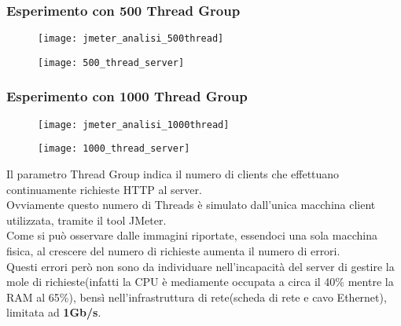 \subsubsection{Esperimento con 500 Thread Group}
\begin{minipage}{\linewidth}
  \centering
  \begin{minipage}{1\linewidth}
    \begin{figure}[H]
      \texttt{[image: jmeter\_analisi\_500thread]}
    \end{figure}
  \end{minipage}
  \begin{minipage}{1\linewidth}
    \begin{figure}[H]
      \texttt{[image: 500\_thread\_server]}
    \end{figure}
  \end{minipage}
\end{minipage}

\subsubsection{Esperimento con 1000 Thread Group}
\begin{minipage}{\linewidth}
  \centering
  \begin{minipage}{1\linewidth}
    \begin{figure}[H]
      \texttt{[image: jmeter\_analisi\_1000thread]}
    \end{figure}
  \end{minipage}
  \begin{minipage}{1\linewidth}
    \begin{figure}[H]
      \texttt{[image: 1000\_thread\_server]}
    \end{figure}
  \end{minipage}
\end{minipage}

\vspace{1cm}
Il parametro Thread Group indica il numero di clients che effettuano continuamente
richieste HTTP al server.\\
Ovviamente questo numero di Threads è simulato dall'unica macchina client utilizzata,
tramite il tool JMeter.\\
Come si può osservare dalle immagini riportate, essendoci una sola macchina fisica,
al crescere del numero di richieste aumenta il numero di errori.\\
Questi errori però non sono da individuare nell'incapacità del server di gestire
la mole di richieste(infatti la CPU è mediamente occupata a circa il 40\% mentre
la RAM al 65\%), bensì nell'infrastruttura di rete(scheda di rete e cavo Ethernet),
limitata ad \textbf{1Gb/s}.\\

